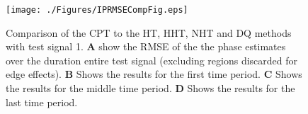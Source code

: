 \documentclass[a4paper]{IEEEtran}
\begin{document}
\begin{figure}[!h]
	\centering
		\texttt{[image: ./Figures/IPRMSECompFig.eps]}
	\caption{Comparison of the CPT to the HT, HHT, NHT and DQ methods with test signal 1. \textbf{A} show the RMSE of the the phase estimates over the duration entire test signal (excluding regions discarded for edge effects). \textbf{B} Shows the results for the first time period. \textbf{C} Shows the results for the middle time period. \textbf{D} Shows the results for the last time period.}
	\label{fig:ResultsTestSig1}
\end{figure}

% 
% 
\end{document}
